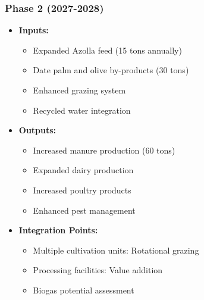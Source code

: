 \subsubsection{Phase 2 (2027-2028)}
\begin{itemize}
    \item \textbf{Inputs:}
    \begin{itemize}
        \item Expanded Azolla feed (15 tons annually)
        \item Date palm and olive by-products (30 tons)
        \item Enhanced grazing system
        \item Recycled water integration
    \end{itemize}
    \item \textbf{Outputs:}
    \begin{itemize}
        \item Increased manure production (60 tons)
        \item Expanded dairy production
        \item Increased poultry products
        \item Enhanced pest management
    \end{itemize}
    \item \textbf{Integration Points:}
    \begin{itemize}
        \item Multiple cultivation units: Rotational grazing
        \item Processing facilities: Value addition
        \item Biogas potential assessment
    \end{itemize}
\end{itemize}

